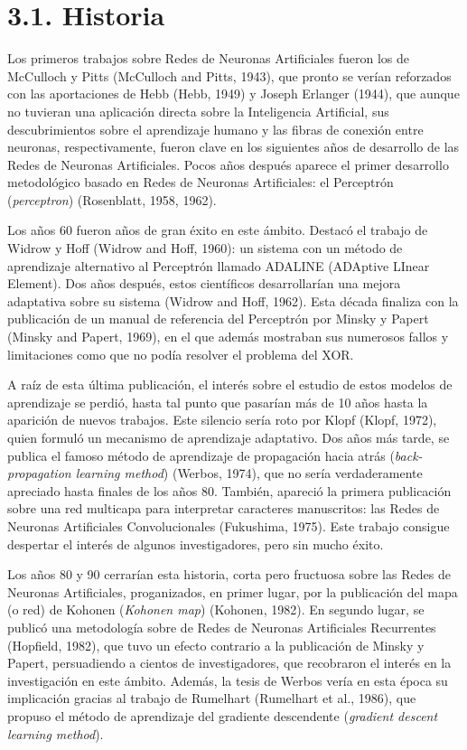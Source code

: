 \documentclass[spanish,a4paper,12pt,twoside]{report}
\begin{document}
    \section*{\Large 3.1. Historia}
    Los primeros trabajos sobre Redes de Neuronas Artificiales fueron los de McCulloch y Pitts (McCulloch and Pitts, 1943), que pronto se verían reforzados con las aportaciones de Hebb (Hebb, 1949) y Joseph Erlanger (1944), que aunque no tuvieran una aplicación directa sobre la Inteligencia Artificial, sus descubrimientos sobre el aprendizaje humano y las fibras de conexión entre neuronas, respectivamente, fueron clave en los siguientes años de desarrollo de las Redes de Neuronas Artificiales. Pocos años después aparece el primer desarrollo metodológico basado en Redes de Neuronas Artificiales: el Perceptrón (\emph{perceptron}) (Rosenblatt, 1958, 1962). \par
    Los años 60 fueron años de gran éxito en este ámbito. Destacó el trabajo de Widrow y Hoff (Widrow and Hoff, 1960): un sistema con un método de aprendizaje alternativo al Perceptrón llamado ADALINE (ADAptive LInear Element). Dos años después, estos científicos desarrollarían una mejora adaptativa sobre su sistema (Widrow and Hoff, 1962). Esta década finaliza con la publicación de un manual de referencia del Perceptrón por Minsky y Papert (Minsky and Papert, 1969), en el que además mostraban sus numerosos fallos y limitaciones como que no podía resolver el problema del XOR. \par
    A raíz de esta última publicación, el interés sobre el estudio de estos modelos de aprendizaje se perdió, hasta tal punto que pasarían más de 10 años hasta la aparición de nuevos trabajos. Este silencio sería roto por Klopf (Klopf, 1972), quien formuló un mecanismo de aprendizaje adaptativo. Dos años más tarde, se publica el famoso método de aprendizaje de propagación hacia atrás (\emph{back-propagation learning method}) (Werbos, 1974), que no sería verdaderamente apreciado hasta finales de los años 80. También, apareció la primera publicación sobre una red multicapa para interpretar caracteres manuscritos: las Redes de Neuronas Artificiales Convolucionales (Fukushima, 1975). Este trabajo consigue despertar el interés de algunos investigadores, pero sin mucho éxito. \par
    Los años 80 y 90 cerrarían esta historia, corta pero fructuosa sobre las Redes de Neuronas Artificiales, proganizados, en primer lugar, por la publicación del mapa (o red) de Kohonen (\emph{Kohonen map}) (Kohonen, 1982). En segundo lugar, se publicó una metodología sobre de Redes de Neuronas Artificiales Recurrentes (Hopfield, 1982), que tuvo un efecto contrario a la publicación de Minsky y Papert, persuadiendo a cientos de investigadores, que recobraron el interés en la investigación en este ámbito. Además, la tesis de Werbos vería en esta época su implicación gracias al trabajo de Rumelhart (Rumelhart et al., 1986), que propuso el método de aprendizaje del gradiente descendente (\emph{gradient descent learning method}).
    
\end{document}
